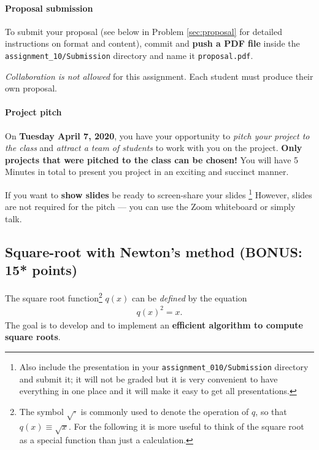 \documentclass[letterpaper]{scrartcl}
\newcommand{\anumber}{10}
\newcommand{\anum}{\anumber}
\begin{document}
\paragraph{Proposal submission}

To submit your proposal (see below in Problem \ref{sec:proposal} for
detailed instructions on format and content), commit and \textbf{push
  a PDF file} inside the \texttt{assignment\_\anum{}/Submission}
directory and name it \texttt{proposal.pdf}.

\emph{Collaboration is not allowed} for this assignment. Each student
must produce their own proposal.


\paragraph{Project pitch}

On \textbf{Tuesday April 7, 2020}, you have your opportunity to
\emph{pitch your project to the class} and \emph{attract a team of
  students} to work with you on the project. \textbf{Only projects
  that were pitched to the class can be chosen!} You will have 5
Minutes in total to present you project in an exciting and succinct
manner.

If you want to \textbf{show slides} be ready to screen-share your
slides \footnote{Also include the presentation in your
  \texttt{assignment\_0\anumber{}/Submission} directory and submit it;
  it will not be graded but it is very convenient to have everything
  in one place and it will make it easy to get all presentations.}
However, slides are not required for the pitch --- you can use the
Zoom whiteboard or simply talk.


\subsection{Square-root with Newton's method (BONUS: 15* points)}
\label{sec:sqrt}

The square root function\footnote{The symbol $\sqrt{\cdot}$ is
  commonly used to denote the operation of $q$, so that
  $q(x) \equiv \sqrt{x}$. For the following it is more useful to think
  of the square root as a special function than just a calculation.}
$q(x)$ can be \emph{defined} by the equation
\begin{gather}
  \label{eq:sqrtdef}
  q(x)^{2} = x.
\end{gather}
The goal is to develop and to implement an \textbf{efficient algorithm
to compute square roots}.
\end{document}
